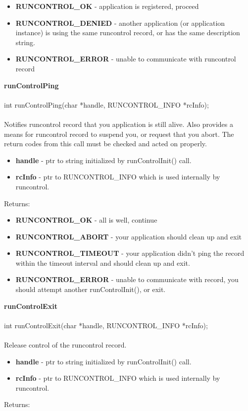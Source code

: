 \documentclass[11pt]{article}
\begin{document}
\begin{itemize}
\item {\bf RUNCONTROL\_OK} - application is registered, proceed
\item {\bf RUNCONTROL\_DENIED} - another application (or application instance) is using the same runcontrol record, or has the same description string.
\item {\bf RUNCONTROL\_ERROR} - unable to communicate with runcontrol record
\end{itemize}
{\bf runControlPing}\\
\\
int runControlPing(char *handle, RUNCONTROL\_INFO *rcInfo);\\
\\
Notifies runcontrol record that you application is still alive. Also provides a means for runcontrol record to suspend you, or request that you abort. The return codes from this call must be checked and acted on properly.

\begin{itemize}
\item {\bf handle} - ptr to string initialized by runControlInit() call.
\item {\bf rcInfo} - ptr to RUNCONTROL\_INFO which is used internally by runcontrol.
\end{itemize}
Returns:

\begin{itemize}
\item {\bf RUNCONTROL\_OK} - all is well, continue
\item {\bf RUNCONTROL\_ABORT} - your application should clean up and exit
\item {\bf RUNCONTROL\_TIMEOUT} - your application didn't ping the record within the timeout interval and should clean up and exit.
\item {\bf RUNCONTROL\_ERROR} - unable to communicate with record, you should attempt another runControlInit(), or exit.
\end{itemize}
{\bf runControlExit}\\
\\
int runControlExit(char *handle, RUNCONTROL\_INFO *rcInfo);\\
\\
Release control of the runcontrol record.

\begin{itemize}
\item {\bf handle} - ptr to string initialized by runControlInit() call.
\item {\bf rcInfo} - ptr to RUNCONTROL\_INFO which is used internally by runcontrol.
\end{itemize}
Returns:
\end{document}
